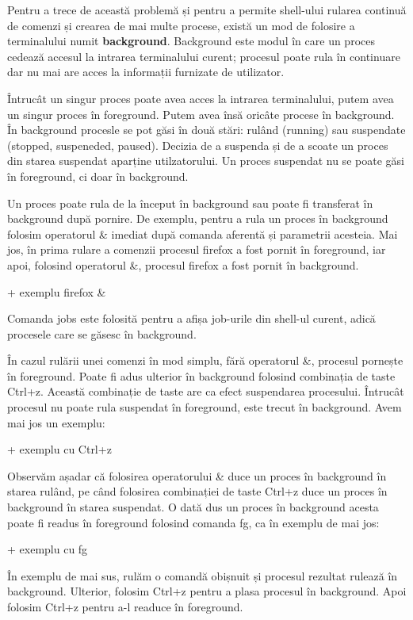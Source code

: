 Pentru a trece de această problemă și pentru a permite shell-ului rularea
continuă de comenzi și crearea de mai multe procese, există un mod de folosire a
terminalului numit \textbf{background}. Background este modul în care un proces cedează
accesul la intrarea terminalului curent; procesul poate rula în continuare dar
nu mai are acces la informații furnizate de utilizator.

Întrucât un singur proces poate avea acces la intrarea terminalului, putem avea
un singur proces în foreground. Putem avea însă oricâte procese în background.
În background procesle se pot găsi în două stări: rulând (running) sau
suspendate (stopped, suspeneded, paused). Decizia de a suspenda și de a scoate
un proces din starea suspendat aparține utilzatorului. Un proces suspendat nu se
poate găsi în foreground, ci doar în background.

Un proces poate rula de la început în background sau poate fi transferat în
background după pornire. De exemplu, pentru a rula un proces în background
folosim operatorul \& imediat după comanda aferentă și parametrii acesteia. Mai
jos, în prima rulare a comenzii procesul firefox a fost pornit în foreground,
iar apoi, folosind operatorul \&, procesul firefox a fost pornit în background.

+ exemplu firefox \&

Comanda jobs este folosită pentru a afișa job-urile din shell-ul curent, adică
procesele care se găsesc în background.

În cazul rulării unei comenzi în mod simplu, fără operatorul \&, procesul
pornește în foreground. Poate fi adus ulterior în background folosind combinația
de taste Ctrl+z. Această combinație de taste are ca efect suspendarea
procesului. Întrucât procesul nu poate rula suspendat în foreground, este trecut
în background. Avem mai jos un exemplu:

+ exemplu cu Ctrl+z

Observăm așadar că folosirea operatorului \& duce un proces în background în
starea rulând, pe când folosirea combinației de taste Ctrl+z duce un proces în
background în starea suspendat. O dată dus un proces în background acesta poate
fi readus în foreground folosind comanda fg, ca în exemplu de mai jos:

+ exemplu cu fg

În exemplu de mai sus, rulăm o comandă obișnuit și procesul rezultat rulează în
background. Ulterior, folosim Ctrl+z pentru a plasa procesul în background. Apoi
folosim Ctrl+z pentru a-l readuce în foreground.

